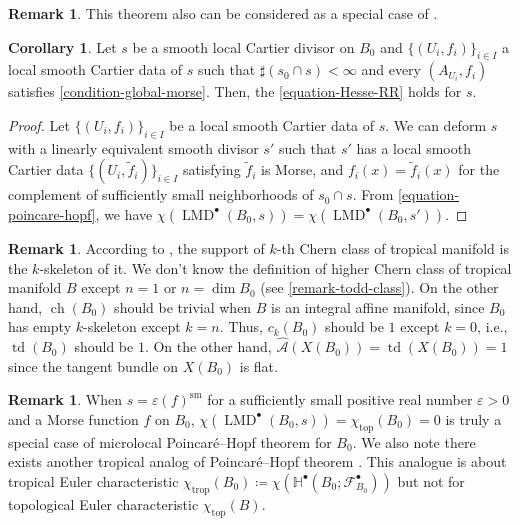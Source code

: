\documentclass[a4paper,dvipdfmx,reqno,12pt]{amsart}
\theoremstyle{definition}
\newtheorem{corollary}[theorem]{Corollary}
\newtheorem{remark}[theorem]{Remark}
\newcommand{\deq}{\coloneqq}
\newcommand{\vep}{\varepsilon}%
\newcommand{\mb}[1]{\mathbb{#1}}%
\newcommand{\mcal}[1]{\mathcal{#1}}%
\newcommand{\opn}[1]{\operatorname{#1}}
\numberwithin{equation}{section}
\begin{document}
\begin{remark} \label{rmk: integral_mirror}
This theorem also can be considered as
a special case of \cite{MR3656481,MR4301560}.
\end{remark}

\begin{corollary}
Let $s$ be a smooth local Cartier divisor on $B_0$ and 
$\{(U_i,f_i)\}_{i\in I}$ a local smooth Cartier 
data of $s$ such that $\sharp (s_0\cap s)<\infty$ and
every $(A_{U_i},f_i)$ satisfies \cref{condition-global-morse}.
Then, the \cref{equation-Hesse-RR} holds for $s$.
\end{corollary}

\begin{proof}
Let $\{(U_i,f_i)\}_{i\in I}$ be a local smooth Cartier
data of $s$. We can deform $s$ with a linearly equivalent
smooth divisor $s'$ 
such that $s'$ has a local smooth Cartier data 
$\{(U_i,\tilde{f}_i)\}_{i\in I}$ satisfying 
$\tilde{f}_i$ is Morse, and 
$f_i(x)=\tilde{f}_i(x)$ for the complement of 
sufficiently small neighborhoods of $s_0\cap s$. 
From \cref{equation-poincare-hopf}, we have
$\chi(\opn{LMD}^{\bullet}(B_0,s))
=\chi(\opn{LMD}^{\bullet}(B_0,s'))$.
\end{proof}



\begin{remark}

According to \cite[5.3]{mikhalkinTropicalGeometryIts2006},
the support of $k$-th Chern class of tropical manifold is 
the $k$-skeleton of it.
We don't know the definition of higher Chern class of tropical manifold $B$ except
$n=1$ or $n=\dim B_0$ (see \cref{remark-todd-class}).
On the other hand, $\opn{ch}(B_0)$ should be trivial when $B$ is
an integral affine manifold, since $B_0$ has empty
$k$-skeleton except $k=n$.
Thus, $c_{k}(B_0)$ should be $1$ except $k=0$, 
i.e., $\opn{td}(B_0)$ should be $1$. 
On the other hand,
 $\hat{\mcal{A}}(X(B_0))=\opn{td}(X(B_0))=1$
since the tangent bundle on $X(B_0)$ is flat.
\end{remark}

\begin{remark}
When $s=\vep (f)^{\opn{sm}}$ for a sufficiently small
positive real number $\vep >0$ and 
a Morse function $f$ on $B_0$, 
$\chi(\opn{LMD}^{\bullet}(B_0,s))=
\chi_{\opn{top}}(B_0)=0$ is 
truly a special case of microlocal Poincar\'e--Hopf theorem for $B_0$.
We also note there exists another tropical analog of Poincar\'e--Hopf theorem
  \cite{MR4540954}. This analogue is about tropical Euler characteristic
$\chi_{\opn{trop}}(B_0)\deq 
\chi(\mb{H}^{\bullet}(B_0;\mcal{F}_{B_0}^{\bullet}))$
  but not for topological Euler characteristic $\chi_{\opn{top}}(B)$.
\end{remark}
\end{document}
